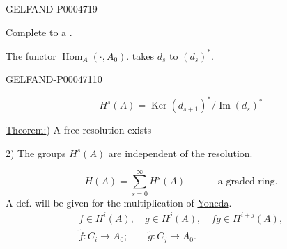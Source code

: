 \begin{GelfandAdjacentEvidence}{GELFAND-P000471}{9}


Complete to a .

The functor $\operatorname{Hom}_A(\cdot,A_0)$. takes $d_s$ to $(d_s)^*$.
\end{GelfandAdjacentEvidence}
\begin{GelfandAdjacentEvidence}{GELFAND-P000471}{10}

\[
H^s(A)=\operatorname{Ker}(d_{s+1})^*/\operatorname{Im}(d_s)^*
\]
\end{GelfandAdjacentEvidence}


\uline{Theorem:}) A free resolution exists

\hspace*{6em}2) The groups $H^s(A)$ are independent of the resolution.

\[
H(A)=\sum_{s=0}^{\infty}H^s(A)\qquad\text{— a graded ring.}
\]
A def. will be given for the multiplication of \uline{Yoneda}.
\[
\begin{gathered}
f\in H^i(A),\quad g\in H^j(A),\quad fg\in H^{i+j}(A),\\
\widetilde f\colon C_i\longrightarrow A_0;\qquad
\widetilde g\colon C_j\longrightarrow A_0.
\end{gathered}
\]



